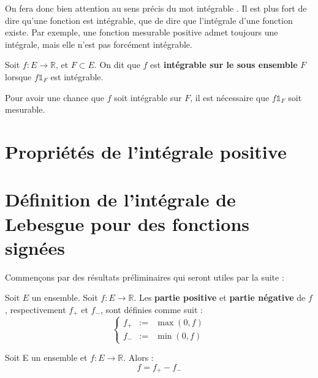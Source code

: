 \documentclass[../integ-proba.tex]{subfiles}
\begin{document}
  \begin{rem}
    \label{rem:attint}
    On fera donc bien attention au sens précis du mot \og intégrable \fg.
    Il est plus fort de dire qu'une fonction est intégrable, que de dire que l'intégrale d'une fonction existe.
    Par exemple, une fonction mesurable positive admet toujours une intégrale, mais elle n'est pas forcément intégrable.
  \end{rem}

  \begin{defi}
    Soit $f:E\longrightarrow\mathbb{R}$, et $F\subset E$.
    On dit que $f$ est \textbf{intégrable sur le sous ensemble} $F$ lorsque $f\mathds{1}_F$ est intégrable.
  \end{defi}

  \begin{rem}
    Pour avoir une chance que $f$ soit intégrable sur $F$, il est nécessaire que $f\mathds{1}_F$ soit mesurable.
  \end{rem}

  \section{Propriétés de l'intégrale positive}


  \section{Définition de l'intégrale de Lebesgue pour des fonctions signées}

  Commençons par des résultats préliminaires qui seront utiles par la suite :

  \begin{defi}
    \label{def:partieposneg}
    Soit $E$ un ensemble.
    Soit $f:E\longrightarrow\mathbb{R}$.
    Les \textbf{partie positive} et \textbf{partie négative} de $f$, respectivement $f_+$ et $f_-$, sont définies comme suit :
    \begin{displaymath}
      \left\{
      \begin{array}{rcl}
        f_+ &:=&\max(0,f)\\
        f_-&:=&\min(0,f)
      \end{array}
    \right.
    \end{displaymath}
  \end{defi}

  \begin{prop}
    Soit E un ensemble et $f:E\longrightarrow\mathbb{R}$.
    Alors :
    \begin{displaymath}
      f = f_+ - f_-
    \end{displaymath}
  \end{prop}
\end{document}
